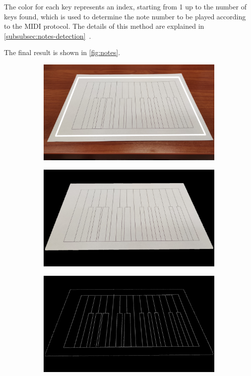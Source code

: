 The color for each key represents an index, starting from 1 up to the number of keys found,
which is used to determine the note number to be played according to the MIDI protocol.
The details of this method are explained in \autoref{subsubsec:notes-detection}~.

The final result is shown in \autoref{fig:notes}.

\begin{figure}[ht]
	\centering
	\begin{subfigure}{0.49\textwidth}
		\centering
		\includegraphics[width=\textwidth]{images/application/45deg/camera-with-frame}
		\caption{}
		\label{fig:perimeter}
	\end{subfigure}
	\hfill
	\begin{subfigure}{0.49\textwidth}
		\centering
		\includegraphics[width=\textwidth]{images/application/45deg/masked}
		\caption{}
		\label{fig:mat}
	\end{subfigure}
	\hfill
	\begin{subfigure}{0.49\textwidth}
		\centering
		\includegraphics[width=\textwidth]{images/application/45deg/canny}

\end{subfigure}
\end{figure}
